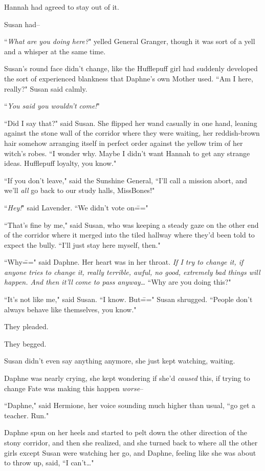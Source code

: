 Hannah had agreed to stay out of it.

Susan had\---

\later

``\emph{What are you doing here?}" yelled General Granger, though it was sort of a yell and a whisper at the same time.

Susan's round face didn't change, like the Hufflepuff girl had suddenly developed the sort of experienced blankness that Daphne's own Mother used. ``Am I here, really?" Susan said calmly.

``\emph{You said you wouldn't come!}"

``Did I say that?" said Susan. She flipped her wand casually in one hand, leaning against the stone wall of the corridor where they were waiting, her reddish-brown hair somehow arranging itself in perfect order against the yellow trim of her witch's robes. ``I wonder why. Maybe I didn't want Hannah to get any strange ideas. Hufflepuff loyalty, you know."

``If you don't leave," said the Sunshine General, ``I'll call a mission abort, and we'll \emph{all} go back to our study halls, Miss\?Bones!"

``\emph{Hey!}" said Lavender. ``We didn't vote on\==="

``That's fine by me," said Susan, who was keeping a steady gaze on the other end of the corridor where it merged into the tiled hallway where they'd been told to expect the bully. ``I'll just stay here myself, then."

``Why\===" said Daphne. Her heart was in her throat. \emph{If I try to change it, if \emph{anyone} tries to change it, really terrible, awful, no good, extremely bad things will happen. And then it'll come to pass anyway{\ldots}} ``Why are you doing this?"

``It's not like me," said Susan. ``I know. But\===" Susan shrugged. ``People don't always behave like themselves, you know."

They pleaded.

They begged.

Susan didn't even say anything anymore, she just kept watching, waiting.

Daphne was nearly crying, she kept wondering if she'd \emph{caused} this, if trying to change Fate was making this happen \emph{worse}\---

``Daphne," said Hermione, her voice sounding much higher than usual, ``go get a teacher. Run."

Daphne spun on her heels and started to pelt down the other direction of the stony corridor, and then she realized, and she turned back to where all the other girls except Susan were watching her go, and Daphne, feeling like she was about to throw up, said, ``I can't{\ldots}"

